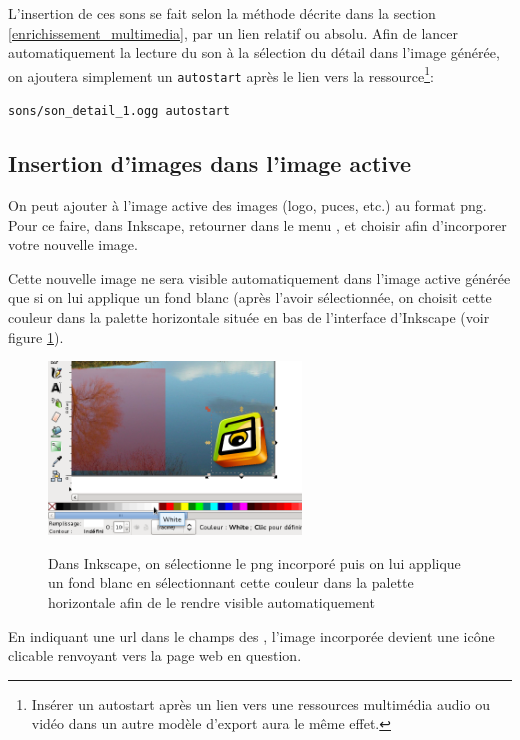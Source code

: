 {L'insertion de ces sons se fait selon la méthode décrite dans la section \ref{enrichissement_multimedia}, 
par un lien relatif ou absolu. 
Afin de lancer automatiquement la lecture du son à la sélection du détail dans l'image générée, on ajoutera 
simplement un \verb|autostart| après le lien vers la ressource\footnote{Insérer un autostart
après un lien vers une ressources multimédia audio ou vidéo dans un autre modèle d'export aura le même effet.}:\\
\begin{center}
 \verb|sons/son_detail_1.ogg autostart|
\end{center}


\subsection{Insertion d'images dans l'image active}\label{insertion_images}

On peut ajouter à l'image active des images (logo, puces, etc.) au format png.
Pour ce faire, dans Inkscape, retourner dans le menu , et choisir 
afin d'incorporer votre nouvelle image.

Cette nouvelle image ne sera visible automatiquement dans l'image active générée
que si on lui applique un fond blanc (après l'avoir sélectionnée, on choisit cette couleur dans la palette
horizontale située en bas de l'interface d'Inkscape (voir figure \ref{remplissage_blanc}).

\begin{figure}[htp]
 \centering
 \caption{Dans Inkscape, on sélectionne le png incorporé puis on lui applique un fond blanc en sélectionnant 
 cette couleur dans la palette horizontale afin de le rendre visible automatiquement}
 \includegraphics[width=0.6\textwidth]{images/remplissage_blanc}
 \label{remplissage_blanc}
\end{figure}

En indiquant une url dans le champs  des , l'image incorporée
devient une icône clicable renvoyant vers la page web en question.

}
